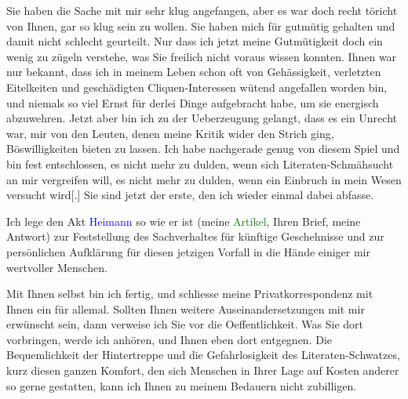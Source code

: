 \pstart
           Sie haben die Sache mit mir sehr klug angefangen, aber es war doch recht töricht von
               Ihnen, gar so klug sein zu wollen. Sie haben mich für gutmütig gehalten und damit
               nicht schlecht ge{\pb}urteilt. Nur
               dass ich jetzt meine Gutmütigkeit doch ein wenig zu zügeln verstehe, was Sie freilich
               nicht voraus wissen konnten. Ihnen war nur bekannt, dass ich in meinem Leben schon
               oft von Gehässigkeit, verletzten Eitelkeiten und geschädigten Cliquen-Interessen
               wütend angefallen worden bin, und niemals so viel Ernst für derlei Dinge aufgebracht
               habe, um sie energisch abzuwehren. Jetzt aber bin ich zu der Ueberzeugung gelangt,
               dass es ein Unrecht war, mir von den Leuten, denen meine Kritik wider den Strich
               ging, Böswilligkeiten bieten zu lassen. Ich habe nachgerade genug von diesem Spiel
               und bin fest entschlossen, es nicht mehr zu dulden, wenn sich Literaten-Schmähsucht
               an mir vergreifen will, es nicht mehr zu dulden, wenn ein Einbruch in mein Wesen
               versucht wird{[}.{]} Sie sind jetzt der erste, den ich wieder einmal
               dabei abfasse.\pend
           
\pstart
           Ich lege den Akt \textcolor{blue}{Heimann}{}\ledrightnote{\textcolor{blue}{Moritz Heimann}} so wie er ist (meine
                  \textcolor{green}{Artikel}{}\ledrightnote{{$\rightarrow$}\textcolor{green}{Der Fall Hauptmann}{\newline}{$\rightarrow$}\textcolor{green}{Der Fall Brahm}}, Ihren
               Brief, meine Antwort) zur Feststellung des Sachverhaltes für künftige Geschehnisse
               und zur persönlichen Aufklärung für diesen jetzigen Vorfall in die Hände einiger mir
               wertvoller Menschen.\pend
           
\pstart
           Mit Ihnen selbst bin ich fertig, und schliesse meine Privatkorrespondenz mit Ihnen
               ein für allemal. Sollten Ihnen weitere Auseinandersetzungen mit mir erwünscht sein,
               dann verweise ich Sie vor die Oeffentlichkeit. Was Sie dort vorbringen, werde ich
               anhören, und Ihnen eben dort entgegnen. Die Bequemlichkeit der Hintertreppe und die
               Gefahrlosigkeit des Literaten-Schwatzes, kurz diesen ganzen Komfort, den sich
               Menschen in Ihrer Lage auf Kosten anderer so gerne gestatten, kann ich Ihnen zu
               meinem Bedauern nicht zubilligen.\pend
           \endnumbering{}  
      
